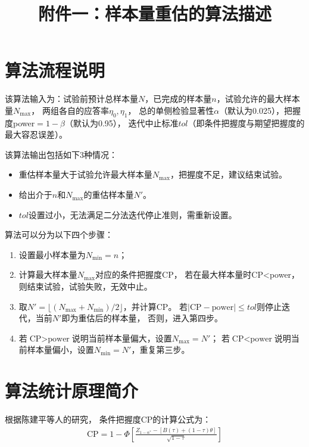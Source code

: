 \documentclass{article}
\title{附件一：样本量重估的算法描述}
\author{}
\date{}
\begin{document}
\maketitle

\section{算法流程说明}
该算法输入为：试验前预计总样本量$N$，已完成的样本量$n$，试验允许的最大样本量$N_{\text{max}}$，
两组各自的应答率$\eta_0,\eta_1$，
总的单侧检验显著性$\alpha$（默认为0.025），把握度power$=1-\beta$（默认为0.95），
迭代中止标准$tol$（即条件把握度与期望把握度的最大容忍误差）。

该算法输出包括如下3种情况：
\begin{itemize}
    \item 重估样本量大于试验允许最大样本量$N_{\text{max}}$，把握度不足，建议结束试验。
    \item 给出介于$n$和$N_{\text{max}}$的重估样本量$N'$。
    \item $tol$设置过小，无法满足二分法迭代停止准则，需重新设置。
\end{itemize}

算法可以分为以下四个步骤：
\begin{enumerate}
    \item 设置最小样本量为$N_{\text{min}} = n$；
    \item 计算最大样本量$N_{\text{max}}$对应的条件把握度CP，
        若在最大样本量时CP<power，则结束试验，试验失败，无效中止。
    \item 取$N'=\lfloor (N_{\text{max}}+N_{\text{min}})/2\rfloor$，并计算CP。
        若$|\text{CP}-\text{power}|\le tol$则停止迭代，当前$N'$即为重估后的样本量，
        否则，进入第四步。
    \item 若$\text{CP}>\text{power}$说明当前样本量偏大，设置$N_{\text{max}}=N'$；
        若$\text{CP}<\text{power}$说明当前样本量偏小，设置$N_{\text{min}}=N'$，重复第三步。
\end{enumerate}

\section{算法统计原理简介}
根据陈建平等人的研究\cite{陈建平2010期中分析的条件把握度及样本含量再估计}，
条件把握度CP的计算公式为：
\begin{align*}
    \text{CP}  = 1-\Phi\left[\frac{Z_{1-\alpha^*}-[B(\tau)+(1-\tau)\theta]}{\sqrt{1-\tau}} \right] 
\end{align*}
\end{document}
